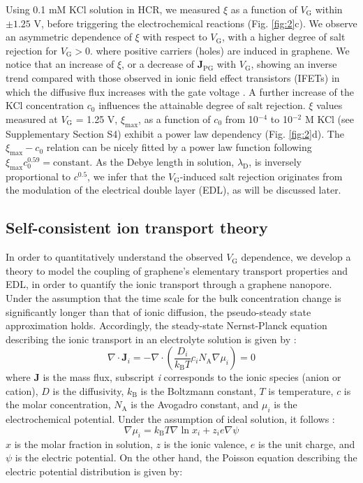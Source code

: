 \documentclass[journal=langd5,email=true, hyperref=true, keywords=false]{achemso}
\newcommand{\Fig}{Fig.}
\begin{document}
Using 0.1 mM KCl solution in HCR, we measured $\xi$ as a function of
$V_{\mathrm{G}}$ within $\pm1.25$ V, before triggering the
electrochemical reactions (\Fig{} \ref{fig:2}c). We observe an
asymmetric dependence of $\xi$ with respect to $V_{\mathrm{G}}$, with
a higher degree of salt rejection for $V_{\mathrm{G}}>0$. where
positive carriers (holes) are induced in graphene. We notice that an
increase of $\xi$, or a decrease of $\boldsymbol{J}_{\mathrm{PG}}$
with $V_{\mathrm{G}}$, showing an inverse trend compared with those
observed in ionic field effect transistors (IFETs) in which the
diffusive flux increases with the gate voltage
\cite{Nam_2009,Cheng_2018}. A further increase of the KCl
concentration $c_{0}$ influences the attainable degree of salt
rejection. $\xi$ values measured at $V_{\mathrm{G}}$ = 1.25 V,
$\xi_{\mathrm{max}}$, as a function of $c_{0}$ from 10$^{-4}$ to
10$^{-2}$ M KCl (see Supplementary Section S4) exhibit a power law
dependency (\Fig{} \ref{fig:2}d). The $\xi_{\mathrm{max}}-c_{0}$
relation can be nicely fitted by a power law function following
$\xi_{\mathrm{max}} c_{0}^{0.59} = \mathrm{constant}$. As the Debye
length in solution, $\lambda_{\mathrm{D}}$, is inversely proportional
to $c^{0.5}$, we infer that the $V_{\mathrm{G}}$-induced salt
rejection originates from the modulation of the electrical double
layer (EDL), as will be discussed later.

\subsection{Self-consistent ion transport theory}
\label{sec:theory}

In order to quantitatively understand the observed $V_{\mathrm{G}}$
dependence, we develop a theory to model the coupling of graphene’s
elementary transport properties and EDL, in order to quantify the
ionic transport through a graphene nanopore. Under the assumption that
the time scale for the bulk concentration change is significantly
longer than that of ionic diffusion, the pseudo-steady state
approximation holds. Accordingly, the steady-state Nernst-Planck
equation describing the ionic transport in an electrolyte solution is
given by \cite{MacGillivray_1968}:
\begin{equation}
  \label{eq:pnp}
  \nabla \cdot \boldsymbol{J}_{i} = -\nabla \cdot (\frac{D_{i}}{k_{\mathrm{B}}T} c_{i} N_{\mathrm{A}} \nabla \mu_{i}) = 0
\end{equation}
where $\boldsymbol{J}$ is the mass flux, subscript \textit{i}
corresponds to the ionic species (anion or cation), $D$ is the diffusivity,
$k_{\mathrm{B}}$ is the Boltzmann constant, $T$ is temperature, $c$ is
the molar concentration, $N_{\mathrm{A}}$ is the Avogadro constant,
and $\mu_{i}$ is the electrochemical potential. Under the assumption
of ideal solution, it follows \cite{Kilic_2007}:
\begin{equation}
  \label{eq:mu}
  \nabla \mu_{i} = k_{\mathrm{B}} T \nabla \ln x_{i} + z_{i} e \nabla \psi
\end{equation}
 $x$ is the molar fraction in solution, $z$ is the ionic valence,
$e$ is the unit charge, and $\psi$ is the electric potential. On the
other hand, the Poisson equation describing the electric potential
distribution is given by:
\end{document}
